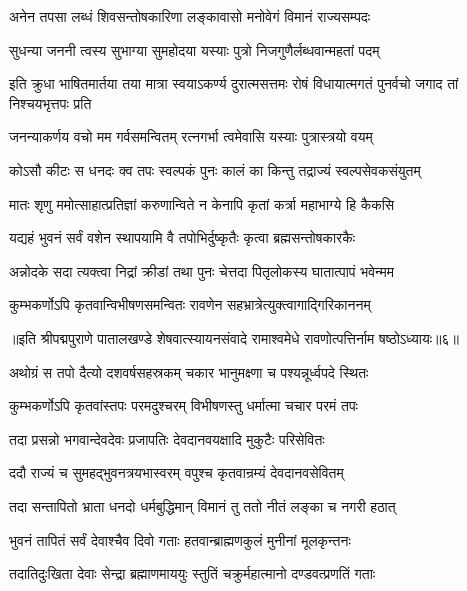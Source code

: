 \twolineshloka
{अनेन तपसा लब्धं शिवसन्तोषकारिणा}
{लङ्कावासो मनोवेगं विमानं राज्यसम्पदः}%

\twolineshloka
{सुधन्या जननी त्वस्य सुभाग्या सुमहोदया}
{यस्याः पुत्रो निजगुणैर्लब्धवान्महतां पदम्}%

\twolineshloka
{इति क्रुधा भाषितमार्तया तया मात्रा स्वयाऽकर्ण्य दुरात्मसत्तमः}
{रोषं विधायात्मगतं पुनर्वचो जगाद तां निश्चयभृत्तपः प्रति}%


\twolineshloka
{जनन्याकर्णय वचो मम गर्वसमन्वितम्}
{रत्नगर्भा त्वमेवासि यस्याः पुत्रास्त्रयो वयम्}%

\twolineshloka
{कोऽसौ कीटः स धनदः क्व तपः स्वल्पकं पुनः}
{कालं का किन्तु तद्राज्यं स्वल्पसेवकसंयुतम्}%

\twolineshloka
{मातः शृणु ममोत्साहात्प्रतिज्ञां करुणान्विते}
{न केनापि कृतां कर्त्रा महाभाग्ये हि कैकसि}%

\twolineshloka
{यद्यहं भुवनं सर्वं वशेन स्थापयामि वै}
{तपोभिर्दुष्कृतैः कृत्वा ब्रह्मसन्तोषकारकैः}%

\twolineshloka
{अन्नोदके सदा त्यक्त्वा निद्रां क्रीडां तथा पुनः}
{चेत्तदा पितृलोकस्य घातात्पापं भवेन्मम}%

\twolineshloka
{कुम्भकर्णोऽपि कृतवान्विभीषणसमन्वितः}
{रावणेन सहभ्रात्रेत्युक्त्वागाद्गिरिकाननम्}%

॥इति श्रीपद्मपुराणे पातालखण्डे शेषवात्स्यायनसंवादे रामाश्वमेधे रावणोत्पत्तिर्नाम षष्ठोऽध्यायः॥६॥



\twolineshloka
{अथोग्रं स तपो दैत्यो दशवर्षसहस्रकम्}
{चकार भानुमक्ष्णा च पश्यन्नूर्ध्वपदे स्थितः}%

\twolineshloka
{कुम्भकर्णोऽपि कृतवांस्तपः परमदुश्चरम्}
{विभीषणस्तु धर्मात्मा चचार परमं तपः}%

\twolineshloka
{तदा प्रसन्नो भगवान्देवदेवः प्रजापतिः}
{देवदानवयक्षादि मुकुटैः परिसेवितः}%

\twolineshloka
{ददौ राज्यं च सुमहद्भुवनत्रयभास्वरम्}
{वपुश्च कृतवान्रम्यं देवदानवसेवितम्}%

\twolineshloka
{तदा सन्तापितो भ्राता धनदो धर्मबुद्धिमान्}
{विमानं तु ततो नीतं लङ्का च नगरी हठात्}%

\twolineshloka
{भुवनं तापितं सर्वं देवाश्चैव दिवो गताः}
{हतवान्ब्राह्मणकुलं मुनीनां मूलकृन्तनः}%

\twolineshloka
{तदातिदुःखिता देवाः सेन्द्रा ब्रह्माणमाययुः}
{स्तुतिं चक्रुर्महात्मानो दण्डवत्प्रणतिं गताः}%

